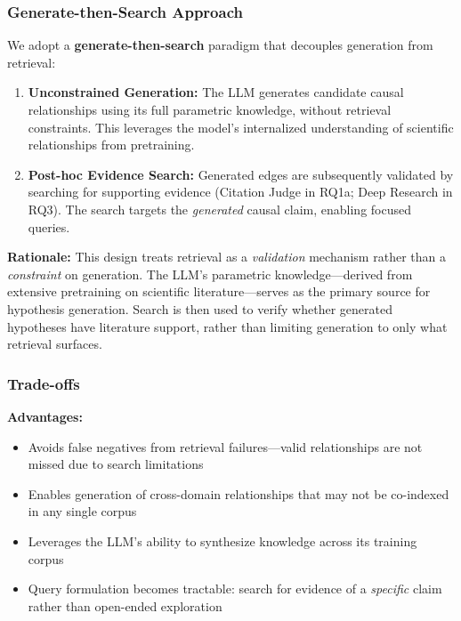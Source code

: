 \subsubsection{Generate-then-Search Approach}

We adopt a \textbf{generate-then-search} paradigm that decouples generation from retrieval:

\begin{enumerate}[noitemsep]
    \item \textbf{Unconstrained Generation:} The LLM generates candidate causal relationships using its full parametric knowledge, without retrieval constraints. This leverages the model's internalized understanding of scientific relationships from pretraining.
    \item \textbf{Post-hoc Evidence Search:} Generated edges are subsequently validated by searching for supporting evidence (Citation Judge in RQ1a; Deep Research in RQ3). The search targets the \textit{generated} causal claim, enabling focused queries.
\end{enumerate}

\textbf{Rationale:} This design treats retrieval as a \textit{validation} mechanism rather than a \textit{constraint} on generation. The LLM's parametric knowledge---derived from extensive pretraining on scientific literature---serves as the primary source for hypothesis generation. Search is then used to verify whether generated hypotheses have literature support, rather than limiting generation to only what retrieval surfaces.

\subsubsection{Trade-offs}

\textbf{Advantages:}
\begin{itemize}[noitemsep]
    \item Avoids false negatives from retrieval failures---valid relationships are not missed due to search limitations
    \item Enables generation of cross-domain relationships that may not be co-indexed in any single corpus
    \item Leverages the LLM's ability to synthesize knowledge across its training corpus
    \item Query formulation becomes tractable: search for evidence of a \textit{specific} claim rather than open-ended exploration
\end{itemize}

